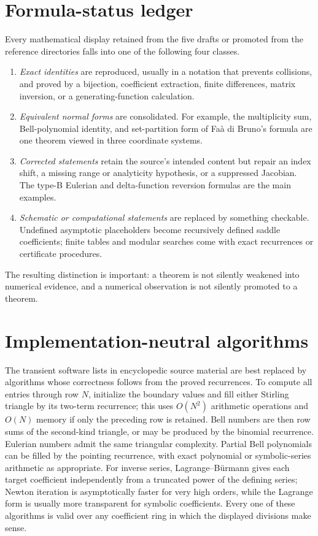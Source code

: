 \documentclass[11pt,a4paper,oneside,openany]{book}
\theoremstyle{definition}
\theoremstyle{remark}
\begin{document}
\section{Formula-status ledger}
Every mathematical display retained from the five drafts or promoted from the
reference directories falls into one of the following four classes.
\begin{enumerate}
\item \emph{Exact identities} are reproduced, usually in a notation that prevents
      collisions, and proved by a bijection, coefficient extraction, finite
      differences, matrix inversion, or a generating-function calculation.
\item \emph{Equivalent normal forms} are consolidated.  For example, the
      multiplicity sum, Bell-polynomial identity, and set-partition form of Faà di
      Bruno's formula are one theorem viewed in three coordinate systems.
\item \emph{Corrected statements} retain the source's intended content but repair
      an index shift, a missing range or analyticity hypothesis, or a suppressed
      Jacobian.  The type-B Eulerian and delta-function reversion formulas are the
      main examples.
\item \emph{Schematic or computational statements} are replaced by something
      checkable.  Undefined asymptotic placeholders become recursively defined
      saddle coefficients; finite tables and modular searches come with exact
      recurrences or certificate procedures.
\end{enumerate}
The resulting distinction is important: a theorem is not silently weakened into
numerical evidence, and a numerical observation is not silently promoted to a
theorem.

\section{Implementation-neutral algorithms}
The transient software lists in encyclopedic source material are best replaced by
algorithms whose correctness follows from the proved recurrences.  To compute all
entries through row $N$, initialize the boundary values and fill either Stirling
triangle by its two-term recurrence; this uses $O(N^2)$ arithmetic operations and
$O(N)$ memory if only the preceding row is retained.  Bell numbers are then row
sums of the second-kind triangle, or may be produced by the binomial recurrence.
Eulerian numbers admit the same triangular complexity.  Partial Bell polynomials
can be filled by the pointing recurrence, with exact polynomial or symbolic-series
arithmetic as appropriate.  For inverse series, Lagrange--Bürmann gives each target
coefficient independently from a truncated power of the defining series; Newton
iteration is asymptotically faster for very high orders, while the Lagrange form is
usually more transparent for symbolic coefficients.  Every one of these algorithms
is valid over any coefficient ring in which the displayed divisions make sense.
\end{document}
